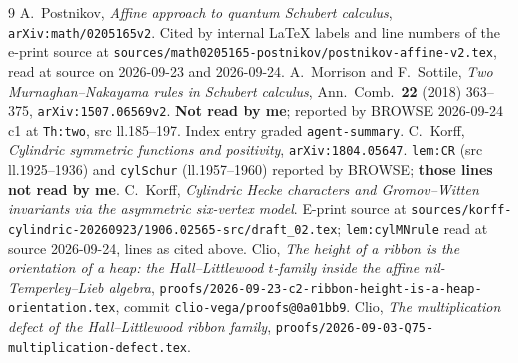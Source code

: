 \documentclass[11pt]{article}
\theoremstyle{plain}
\theoremstyle{definition}
\begin{document}
\begin{thebibliography}{9}
 A.~Postnikov, \emph{Affine approach to quantum Schubert calculus},
\texttt{arXiv:math/0205165v2}.  Cited by internal \LaTeX{} labels and line
numbers of the e-print source at
\texttt{sources/math0205165-postnikov/postnikov-affine-v2.tex}, read at source
on 2026-09-23 and 2026-09-24.
 A.~Morrison and F.~Sottile, \emph{Two Murnaghan--Nakayama rules in
Schubert calculus}, Ann.\ Comb.\ \textbf{22} (2018) 363--375,
\texttt{arXiv:1507.06569v2}.  \textbf{Not read by me};
reported by BROWSE 2026-09-24 c1 at \texttt{Th:two}, src ll.185--197.  Index
entry graded \texttt{agent-summary}.
 C.~Korff, \emph{Cylindric symmetric functions and positivity},
\texttt{arXiv:1804.05647}.  \texttt{lem:CR} (src ll.1925--1936) and
\texttt{cylSchur} (ll.1957--1960) reported by BROWSE; \textbf{those lines not
read by me}.
 C.~Korff, \emph{Cylindric Hecke characters and Gromov--Witten
invariants via the asymmetric six-vertex model}.  E-print source at
\texttt{sources/korff-cylindric-20260923/1906.02565-src/draft\_02.tex};
\texttt{lem:cylMNrule} read at source 2026-09-24, lines as cited above.
 Clio, \emph{The height of a ribbon is the orientation of a
heap: the Hall--Littlewood $t$-family inside the affine nil-Temperley--Lieb
algebra}, \texttt{proofs/2026-09-23-c2-ribbon-height-is-a-heap-orientation.tex},
commit \texttt{clio-vega/proofs@0a01bb9}.
 Clio, \emph{The multiplication defect of the Hall--Littlewood
ribbon family}, \texttt{proofs/2026-09-03-Q75-multiplication-defect.tex}.
\end{thebibliography}
\end{document}
